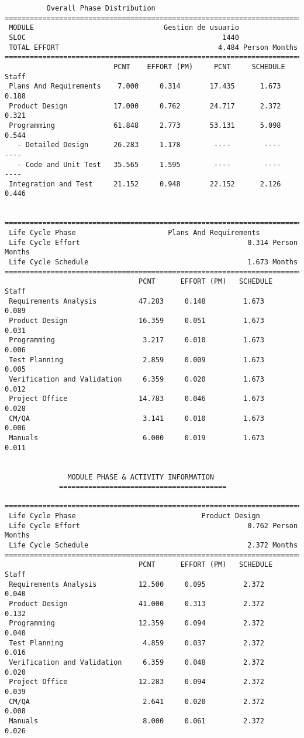 \documentclass[11pt,a4paper,spanish,twoside]{report}
\begin{document}
{\begin{verbatim}
          Overall Phase Distribution
==============================================================================
 MODULE                               Gestion de usuario
 SLOC                                               1440
 TOTAL EFFORT                                      4.484 Person Months
==============================================================================
                          PCNT    EFFORT (PM)     PCNT     SCHEDULE       Staff
 Plans And Requirements    7.000     0.314       17.435      1.673       0.188
 Product Design           17.000     0.762       24.717      2.372       0.321
 Programming              61.848     2.773       53.131      5.098       0.544
   - Detailed Design      26.283     1.178        ----        ----        ----
   - Code and Unit Test   35.565     1.595        ----        ----        ----
 Integration and Test     21.152     0.948       22.152      2.126       0.446


==============================================================================
 Life Cycle Phase                      Plans And Requirements
 Life Cycle Effort                                        0.314 Person Months
 Life Cycle Schedule                                      1.673 Months
==============================================================================
                                PCNT      EFFORT (PM)   SCHEDULE       Staff   
 Requirements Analysis          47.283     0.148         1.673        0.089
 Product Design                 16.359     0.051         1.673        0.031
 Programming                     3.217     0.010         1.673        0.006
 Test Planning                   2.859     0.009         1.673        0.005
 Verification and Validation     6.359     0.020         1.673        0.012
 Project Office                 14.783     0.046         1.673        0.028
 CM/QA                           3.141     0.010         1.673        0.006
 Manuals                         6.000     0.019         1.673        0.011


		       MODULE PHASE & ACTIVITY INFORMATION
		     ========================================

==============================================================================
 Life Cycle Phase                              Product Design
 Life Cycle Effort                                        0.762 Person Months
 Life Cycle Schedule                                      2.372 Months
==============================================================================
                                PCNT      EFFORT (PM)   SCHEDULE       Staff   
 Requirements Analysis          12.500     0.095         2.372        0.040
 Product Design                 41.000     0.313         2.372        0.132
 Programming                    12.359     0.094         2.372        0.040
 Test Planning                   4.859     0.037         2.372        0.016
 Verification and Validation     6.359     0.048         2.372        0.020
 Project Office                 12.283     0.094         2.372        0.039
 CM/QA                           2.641     0.020         2.372        0.008
 Manuals                         8.000     0.061         2.372        0.026


\end{verbatim}}
\end{document}
